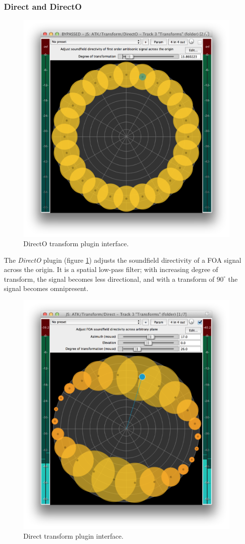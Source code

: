 \documentclass{article}
\begin{document}
\subsubsection{Direct and DirectO}\label{sec:direct}

\begin{figure}[h]
\captionsetup{aboveskip=-6pt}
\centering
\includegraphics[width=0.8\columnwidth]{figures/directOTransform.png}
\caption{DirectO transform plugin interface.\label{fig:directOTransform}}
\end{figure}

The \emph{DirectO} plugin (figure \ref{fig:directOTransform}) adjusts the soundfield directivity of a FOA signal across the origin.
It is a spatial low-pass filter; with increasing degree of transform, the signal becomes less directional, and with a transform of $90^{\circ}$ the signal becomes omnipresent.
  
\begin{figure}[h]
\captionsetup{aboveskip=-6pt}
\centering
\includegraphics[width=0.8\columnwidth]{figures/directTransform.png}
\caption{Direct transform plugin interface.\label{fig:directTransform}}
\end{figure}
\end{document}
